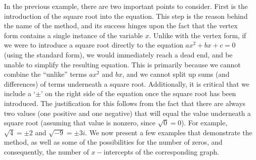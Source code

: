 In the previous example, there are two important points to consider.  First is the introduction of the square root into the equation.  This step is the reason behind the name of the method, and its success hinges upon the fact that the vertex form contains a single instance of the variable $x$.  Unlike with the vertex form, if we were to introduce a square root directly to the equation $ax^2+bx+c=0$ (using the standard form), we would immediately reach a dead end, and be unable to simplify the resulting equation.  This is primarily because we cannot combine the ``unlike'' terms $ax^2$ and $bx$, and we cannot split up sums (and differences) of terms underneath a square root.\pp
Additionally, it is critical that we include a `$\pm$' on the right side of the equation once the square root has been introduced.  The justification for this follows from the fact that there are always two values (one positive and one negative) that will equal the value underneath a square root (assuming that value is nonzero, since $\sqrt{0}=0$).  For example, $\sqrt{4}=\pm 2$ and $\sqrt{-9}=\pm 3i$.\pp
We now present a few examples that demonstrate the method, as well as some of the possibilities for the number of zeros, and consequently, the number of $x-$intercepts of the corresponding graph.

\newpage

